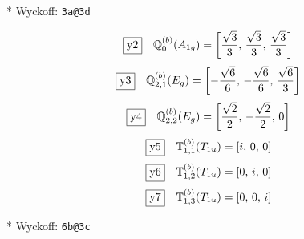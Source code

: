 \documentclass[fleqn,10pt,landscape]{jsarticle}
\begin{document}
\vspace{5mm}

\noindent ** Wyckoff: \texttt{3a@3d}

\begin{dmath*}
\fbox{y2}\quad \mathbb{Q}_{0}^{(b)}(A_{1g})=\left[ \frac{\sqrt{3}}{3},\, \frac{\sqrt{3}}{3},\, \frac{\sqrt{3}}{3} \right]
\end{dmath*}
\begin{dmath*}
\fbox{y3}\quad \mathbb{Q}_{2,1}^{(b)}(E_{g})=\left[ - \frac{\sqrt{6}}{6},\, - \frac{\sqrt{6}}{6},\, \frac{\sqrt{6}}{3} \right]
\end{dmath*}
\begin{dmath*}
\fbox{y4}\quad \mathbb{Q}_{2,2}^{(b)}(E_{g})=\left[ \frac{\sqrt{2}}{2},\, - \frac{\sqrt{2}}{2},\, 0 \right]
\end{dmath*}
\begin{dmath*}
\fbox{y5}\quad \mathbb{T}_{1,1}^{(b)}(T_{1u})=\left[ i,\, 0,\, 0 \right]
\end{dmath*}
\begin{dmath*}
\fbox{y6}\quad \mathbb{T}_{1,2}^{(b)}(T_{1u})=\left[ 0,\, i,\, 0 \right]
\end{dmath*}
\begin{dmath*}
\fbox{y7}\quad \mathbb{T}_{1,3}^{(b)}(T_{1u})=\left[ 0,\, 0,\, i \right]
\end{dmath*}
\vspace{5mm}

\noindent ** Wyckoff: \texttt{6b@3c}
\end{document}
